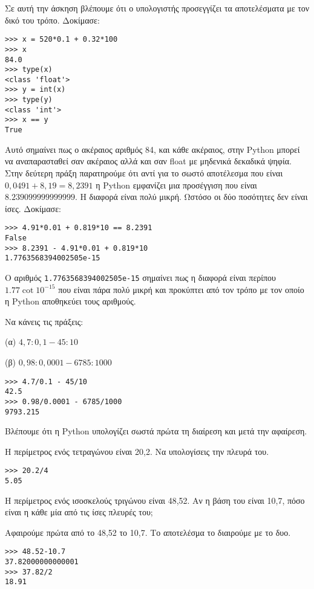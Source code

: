 Σε αυτή την άσκηση βλέπουμε ότι ο υπολογιστής προσεγγίζει τα αποτελέσματα με τον δικό του τρόπο.
Δοκίμασε:
\begin{lstlisting}
>>> x = 520*0.1 + 0.32*100
>>> x
84.0
>>> type(x)
<class 'float'>
>>> y = int(x)
>>> type(y)
<class 'int'>
>>> x == y
True
\end{lstlisting}
Αυτό σημαίνει πως ο ακέραιος αριθμός 84, και κάθε ακέραιος, στην Python μπορεί να αναπαρασταθεί σαν ακέραιος αλλά και σαν float με μηδενικά δεκαδικά ψηφία.
Στην δεύτερη πράξη παρατηρούμε ότι αντί για το σωστό αποτέλεσμα που είναι $0,0491+8,19=8,2391$ η Python εμφανίζει μια προσέγγιση που είναι $8.239099999999999$. Η διαφορά είναι πολύ μικρή. Ωστόσο οι δύο ποσότητες δεν είναι ίσες.
Δοκίμασε:
\begin{lstlisting}
>>> 4.91*0.01 + 0.819*10 == 8.2391
False
>>> 8.2391 - 4.91*0.01 + 0.819*10 
1.7763568394002505e-15
\end{lstlisting}
Ο αριθμός \lstinline{1.7763568394002505e-15} σημαίνει πως η διαφορά είναι περίπου $1.77\cot 10^{-15}$ που είναι πάρα πολύ μικρή και προκύπτει από τον τρόπο με τον οποίο η Python αποθηκεύει τους αριθμούς.

\begin{exercise}
Να κάνεις τις πράξεις:

(α) $4,7:0,1-45:10$

(β) $0,98:0,0001 - 6785:1000$
\end{exercise}

\begin{lstlisting}
>>> 4.7/0.1 - 45/10
42.5
>>> 0.98/0.0001 - 6785/1000
9793.215
\end{lstlisting}
Βλέπουμε ότι η Python υπολογίζει σωστά πρώτα τη διαίρεση και μετά την αφαίρεση.

\begin{exercise}
Η περίμετρος ενός τετραγώνου είναι 20,2. Να υπολογίσεις την πλευρά του.
\end{exercise}
\begin{lstlisting}
>>> 20.2/4
5.05
\end{lstlisting}

\begin{exercise}
Η περίμετρος ενός ισοσκελούς τριγώνου είναι 48,52. Αν η βάση του είναι 10,7, πόσο είναι η κάθε μία από τις ίσες πλευρές του;
\end{exercise}
Αφαιρούμε πρώτα από το 48,52 το 10,7. Το αποτελέσμα το διαιρούμε με το δυο.
\begin{lstlisting}
>>> 48.52-10.7
37.82000000000001
>>> 37.82/2
18.91
\end{lstlisting}

